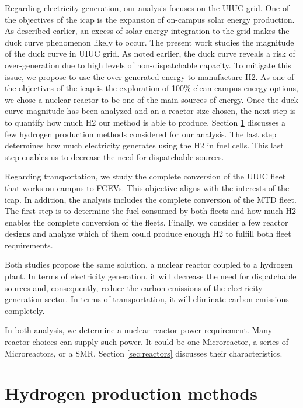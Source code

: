 \documentclass[11pt,letterpaper]{article}
\begin{document}
Regarding electricity generation, our analysis focuses on the \gls{UIUC} grid.
One of the objectives of the \gls{icap} is the expansion of on-campus solar energy production.
As described earlier, an excess of solar energy integration to the grid makes the duck curve phenomenon likely to occur.
The present work studies the magnitude of the duck curve in \gls{UIUC} grid.
As noted earlier, the duck curve reveals a risk of over-generation due to high levels of non-dispatchable capacity.
To mitigate this issue, we propose to use the over-generated energy to manufacture \gls{H2}.
As one of the objectives of the \gls{icap} is the exploration of 100\% clean campus energy options, we chose a nuclear reactor to be one of the main sources of energy.
Once the duck curve magnitude has been analyzed and an a reactor size chosen, the next step is to quantify how much \gls{H2} our method is able to produce.
Section \ref{sec:hydro} discusses a few hydrogen production methods considered for our analysis.
The last step determines how much electricity generates using the \gls{H2} in fuel cells.
This last step enables us to decrease the need for dispatchable sources.

Regarding transportation, we study the complete conversion of the \gls{UIUC} fleet that works on campus to \glspl{FCEV}. This objective aligns with the interests of the \gls{icap}.
In addition, the analysis includes the complete conversion of the \gls{MTD} fleet.
The first step is to determine the fuel consumed by both fleets and how much \gls{H2} enables the complete conversion of the fleets.
Finally, we consider a few reactor designs and analyze which of them could produce enough \gls{H2} to fulfill both fleet requirements.

Both studies propose the same solution, a nuclear reactor coupled to a hydrogen plant.
In terms of electricity generation, it will decrease the need for dispatchable sources and, consequently, reduce the carbon emissions of the electricity generation sector.
In terms of transportation, it will eliminate carbon emissions completely.

In both analysis, we determine a nuclear reactor power requirement.
Many reactor choices can supply such power.
It could be one Microreactor, a series of Microreactors, or a \gls{SMR}.
Section \ref{sec:reactors} discusses their characteristics.

\section{Hydrogen production methods}
\label{sec:hydro}
\end{document}
